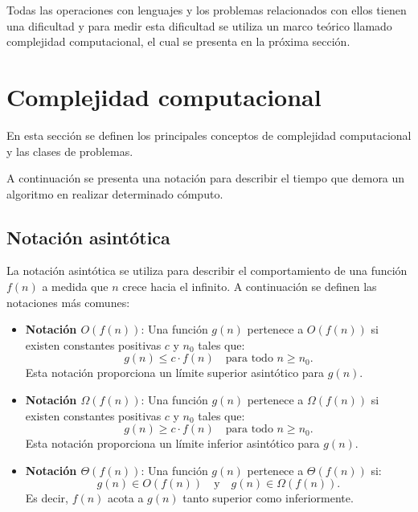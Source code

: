 \documentclass[12pt]{article}
\begin{document}
Todas las operaciones con lenguajes y los problemas relacionados con ellos tienen una dificultad y para medir esta dificultad
se utiliza un marco teórico llamado complejidad computacional, el cual se presenta en la próxima sección.

\section{Complejidad computacional}

En esta sección se definen los principales conceptos de complejidad computacional y las clases de problemas.

A continuación se presenta una notación para describir el tiempo que demora un algoritmo en realizar determinado cómputo.

\subsection{Notación asintótica}

La notación asintótica se utiliza para describir el comportamiento de una función $f(n)$ a medida que $n$ crece hacia el infinito. A continuación se definen las notaciones más comunes:

\begin{itemize}
      \item \textbf{Notación $O(f(n))$}: Una función $g(n)$ pertenece a $O(f(n))$ si existen constantes positivas $c$ y $n_0$ tales que:
            \[
                  g(n) \leq c \cdot f(n) \quad \text{para todo } n \geq n_0.
            \]
            Esta notación proporciona un límite superior asintótico para $g(n)$.
            
      \item \textbf{Notación $\Omega(f(n))$}: Una función $g(n)$ pertenece a $\Omega(f(n))$ si existen constantes positivas $c$ y $n_0$ tales que:
            \[
                  g(n) \geq c \cdot f(n) \quad \text{para todo } n \geq n_0.
            \]
            Esta notación proporciona un límite inferior asintótico para $g(n)$.
            
      \item \textbf{Notación $\Theta(f(n))$}: Una función $g(n)$ pertenece a $\Theta(f(n))$ si:
            \[
                  g(n) \in O(f(n)) \quad \text{y} \quad g(n) \in \Omega(f(n)).
            \]
            Es decir, $f(n)$ acota a $g(n)$ tanto superior como inferiormente.
\end{itemize}
\end{document}
